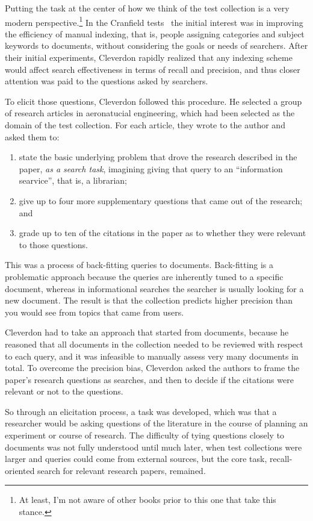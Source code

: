 \documentclass[nobib]{tufte-book}
\begin{document}
Putting the task at the center of how we think of the test collection is a very modern perspective.\footnote{At least, I'm not aware of other books prior to this one that take this stance.}  In the Cranfield tests~\autocite{cleverdon_chapter_1966} the initial interest was in improving the efficiency of manual indexing, that is, people assigning categories and subject keywords to documents, without considering the goals or needs of searchers.  After their initial experiments, Cleverdon rapidly realized that any indexing scheme would affect search effectiveness in terms of recall and precision, and thus closer attention was paid to the questions asked by searchers.

To elicit those questions, Cleverdon followed this procedure.  He selected a group of research articles in aeronatucial engineering, which had been selected as the domain of the test collection.  For each article, they wrote to the author and asked them to:
\begin{enumerate}
    \item state the basic underlying problem that drove the research described in the paper, {\em as a search task}, imagining giving that query to an ``information searvice'', that is, a librarian;
    \item give up to four more supplementary questions that came out of the research; and
    \item grade up to ten of the citations in the paper as to whether they were relevant to those questions.
\end{enumerate}

This was a process of back-fitting queries to documents.  Back-fitting is a problematic approach because the queries are inherently tuned to a specific document, whereas in informational searches the searcher is usually looking for a new document.  The result is that the collection predicts higher precision than you would see from topics that came from users. 

Cleverdon had to take an approach that started from documents, because he reasoned that all documents in the collection needed to be reviewed with respect to each query, and it was infeasible to manually assess very many documents in total.
To overcome the precision bias, Cleverdon asked the authors to frame the paper's research questions as searches, and then to decide if the citations were relevant or not to the questions.

So through an elicitation process, a task was developed, which was that a researcher would be asking questions of the literature in the course of planning an experiment or course of research.  The difficulty of tying questions closely to documents was not fully understood until much later, when test collections were larger and queries could come from external sources, but the core task, recall-oriented search for relevant research papers, remained.
\end{document}
